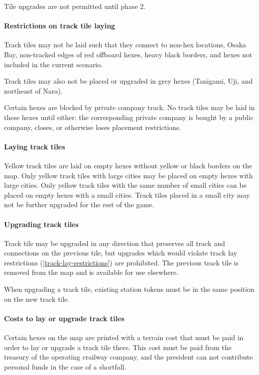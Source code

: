 \documentclass{article}
\begin{document}
\begin{CJK}{UTF8}{min}
\begin{multicols}{2}
Tile upgrades are not permitted until phase 2.

\paragraph{Restrictions on track tile laying}
\label{track-lay-restrictions}
Track tiles may not be laid such that they connect to non-hex
locations, Osaka Bay, non-tracked edges of red offboard hexes, heavy
black borders, and hexes not included in the current scenario.

Track tiles may also not be placed or upgraded in grey hexes
(Tanigami, Uji, and northeast of Nara).

Certain hexes are blocked by private company track. No track tiles may
be laid in these hexes until either: the corresponding private company
is bought by a public company, closes, or otherwise loses placement
restrictions.

\paragraph{Laying track tiles}
Yellow track tiles are laid on empty hexes without yellow or black
borders on the map. Only yellow track tiles with large cities may be
placed on empty hexes with large cities. Only yellow track tiles with
the same number of small cities can be placed on empty hexes with a
small cities. Track tiles placed in a small city may not be further
upgraded for the rest of the game.

\paragraph{Upgrading track tiles}
Track tile may be upgraded in any direction that preserves all track
and connections on the previous tile, but upgrades which would violate
track lay restrictions (\autoref{track-lay-restrictions}) are
prohibited. The previous track tile is removed from the map and is
available for use elsewhere.

When upgrading a track tile, existing station tokens must be in the
same position on the new track tile.

\paragraph{Costs to lay or upgrade track tiles}
Certain hexes on the map are printed with a terrain cost that must be paid in
order to lay or upgrade a track tile there. This cost must be paid
from the treasury of the operating crailway company, and the president
can not contribute personal funds in the case of a shortfall.


\end{multicols}
\end{CJK}
\end{document}
